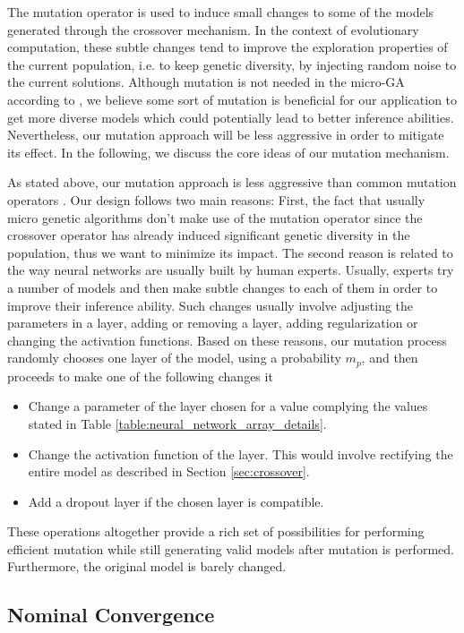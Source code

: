 \documentclass[12pt]{elsart}%
\begin{document}
The mutation operator is used to induce small changes to some of the models generated through the crossover mechanism. In the context of evolutionary computation, these subtle changes tend to improve the exploration properties of the current population, i.e. to keep genetic diversity, by injecting random noise to the current solutions.  Although mutation is not needed in the micro-GA according to \cite{Krishnakumar1989}, we believe some sort of mutation is beneficial for our application to get more diverse models which could potentially lead to better inference abilities. Nevertheless, our mutation approach will be less aggressive in order to mitigate its effect. In the following, we discuss the core ideas of our mutation mechanism.

As stated above, our mutation approach is less aggressive than common mutation operators \cite{Engelbrecht2007}. Our design follows two main reasons: First, the fact that usually micro genetic algorithms don't make use of the mutation operator since the crossover operator has already induced significant genetic diversity in the population, thus we want to minimize its impact. The second reason is related to the way neural networks are usually built by human experts. Usually, experts try a number of models and then make subtle changes to each of them in order to improve their inference ability. Such changes usually involve adjusting the parameters in a layer, adding or removing a layer, adding regularization or changing the activation functions. Based on these reasons, our mutation process randomly chooses one layer of the model, using a probability $m_p$,  and then proceeds to make one of the following changes it
\begin{itemize}
\item Change a parameter of the layer chosen for a value complying the values stated in Table \ref{table:neural_network_array_details}.
\item Change the activation function of the layer. This would involve rectifying the entire model as described in Section \ref{sec:crossover}.
\item Add a dropout layer if the chosen layer is compatible.
\end{itemize} 

These operations altogether provide a rich set of possibilities for performing efficient mutation while still generating valid models after mutation is performed. Furthermore, the original model is barely changed.

\subsection{Nominal Convergence}
\label{sec:convergence}
\end{document}
